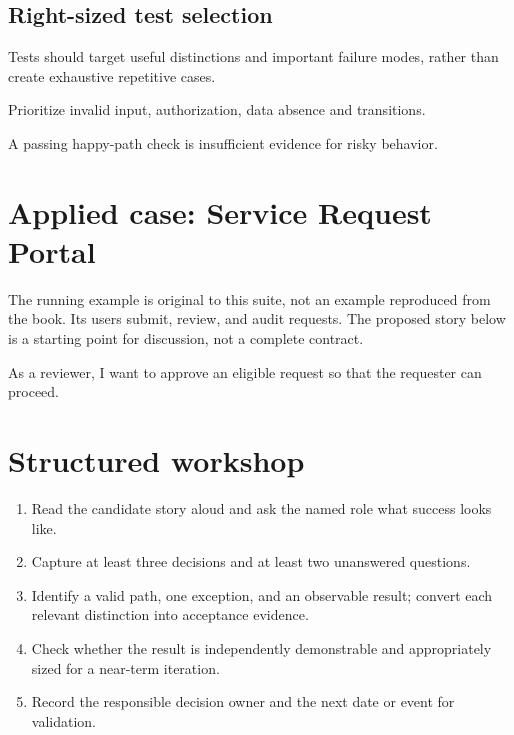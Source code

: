 \documentclass[11pt,letterpaper]{article}
\begin{document}
\subsection{Right-sized test selection}
Tests should target useful distinctions and important failure modes, rather than create exhaustive repetitive cases.

\begin{tcolorbox}[colback=tealback,colframe=navy,title={Engineering translation},breakable]
Prioritize invalid input, authorization, data absence and transitions.

\end{tcolorbox}
\begin{tcolorbox}[colback=amberback,colframe=navy,title={Failure mode to watch},breakable]
A passing happy-path check is insufficient evidence for risky behavior.

\end{tcolorbox}
\section{Applied case: Service Request Portal}
The running example is original to this suite, not an example reproduced from the book. Its users submit, review, and audit requests. The proposed story below is a starting point for discussion, not a complete contract.

\begin{tcolorbox}[colback=blueback,colframe=navy,title={Candidate story},breakable]
As a reviewer, I want to approve an eligible request so that the requester can proceed.

\end{tcolorbox}
\section{Structured workshop}
\begin{enumerate}[leftmargin=*,itemsep=3pt]
\item Read the candidate story aloud and ask the named role what success looks like.
\item Capture at least three decisions and at least two unanswered questions.
\item Identify a valid path, one exception, and an observable result; convert each relevant distinction into acceptance evidence.
\item Check whether the result is independently demonstrable and appropriately sized for a near-term iteration.
\item Record the responsible decision owner and the next date or event for validation.
\end{enumerate}
\end{document}
